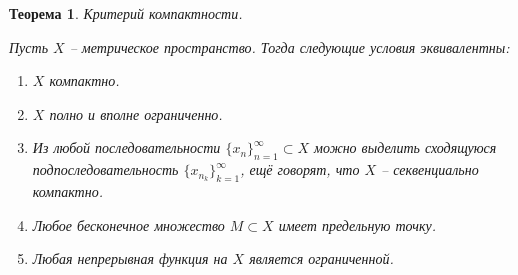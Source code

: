 \documentclass[a4paper,12pt]{article}
\theoremstyle{plain}
\newtheorem{theorem}{Теорема}[section]
\theoremstyle{definition}
\theoremstyle{remark}
\begin{document}
\begin{theorem}
	Критерий компактности.

	Пусть $X$ -- метрическое пространство. Тогда следующие условия эквивалентны:
	\begin{enumerate}
		\item $X$ компактно.
		\item $X$ полно и вполне ограниченно.
		\item Из любой последовательности $\{x_n\}_{n = 1}^\infty \subset X$ можно выделить сходящуюся подпоследовательность $\{x_{n_k}\}_{k = 1}^\infty$, ещё говорят, что $X$ -- секвенциально компактно.
		\item Любое бесконечное множество $M \subset X$ имеет предельную точку.
		\item Любая непрерывная функция на $X$ является ограниченной.
	\end{enumerate}
\end{theorem}
\end{document}
